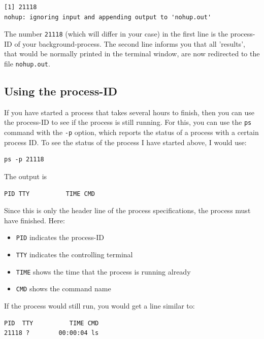 \documentclass[11pt]{article}
\begin{document}
\begin{verbatim}
[1] 21118
nohup: ignoring input and appending output to 'nohup.out'
\end{verbatim}

The number \texttt{21118} (which will differ in your case) in the first line
is the process-ID of your background-process. The second line informs you that
all 'results', that would be normally printed in the terminal window,
are now redirected to the file \texttt{nohup.out}. 

\subsection{Using the process-ID}
\label{sec:orgheadline6}
If you have started a process that takes several hours
to finish, then you can use the process-ID to see if the process is
still running. For this, you can use the \texttt{ps} command with the \texttt{-p}
option, which reports the status of a process with a certain process
ID. To see the status of the process I have started above, I would
use:

\begin{verbatim}
ps -p 21118
\end{verbatim}

The output is

\begin{verbatim}
PID TTY          TIME CMD
\end{verbatim}

Since this is only the header line of the process specifications, the
process must have finished. 
Here:
\begin{itemize}
\item \texttt{PID} indicates the process-ID
\item \texttt{TTY} indicates the controlling terminal
\item \texttt{TIME} shows the time that the process is running already
\item \texttt{CMD} shows the command name
\end{itemize}

If the process would still run, you would
get a line similar to:

\begin{verbatim}
PID  TTY          TIME CMD
21118 ?        00:00:04 ls
\end{verbatim}
\end{document}
